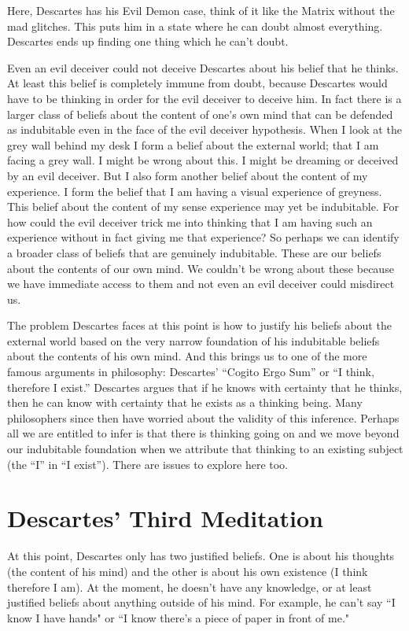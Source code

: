 Here, Descartes has his Evil Demon case, think of it like the Matrix without the mad glitches. This puts him in a state where he can doubt almost everything. Descartes ends up finding one thing which he can't doubt.

Even an evil deceiver could not deceive Descartes about his belief that he thinks. At least this belief is completely immune from doubt, because Descartes would have to be thinking in order for the evil deceiver to deceive him. In fact there is a larger class of beliefs about the content of one’s own mind that can be defended as indubitable even in the face of the evil deceiver hypothesis. When I look at the grey wall behind my desk I form a belief about the external world; that I am facing a grey wall. I might be wrong about this. I might be dreaming or deceived by an evil deceiver. But I also form another belief about the content of my experience. I form the belief that I am having a visual experience of greyness. This belief about the content of my sense experience may yet be indubitable. For how could the evil deceiver trick me into thinking that I am having such an experience without in fact giving me that experience? So perhaps we can identify a broader class of beliefs that are genuinely indubitable. These are our beliefs about the contents of our own mind. We couldn’t be wrong about these because we have immediate access to them and not even an evil deceiver could misdirect us.

The problem Descartes faces at this point is how to justify his beliefs about the external world based on the very narrow foundation of his indubitable beliefs about the contents of his own mind. And this brings us to one of the more famous arguments in philosophy: Descartes’ “Cogito Ergo Sum” or “I think, therefore I exist.” Descartes argues that if he knows with certainty that he thinks, then he can know with certainty that he exists as a thinking being. Many philosophers since then have worried about the validity of this inference. Perhaps all we are entitled to infer is that there is thinking going on and we move beyond our indubitable foundation when we attribute that thinking to an existing subject (the “I” in “I exist”). There are issues to explore here too. 

\section{Descartes' Third Meditation}
At this point, Descartes only has two justified beliefs. One is about his thoughts (the content of his mind) and the other is about his own existence (I think therefore I am). At the moment, he doesn't have any knowledge, or at least justified beliefs about anything outside of his mind. For example, he can't say ``I know I have hands" or ``I know there's a piece of paper in front of me."

